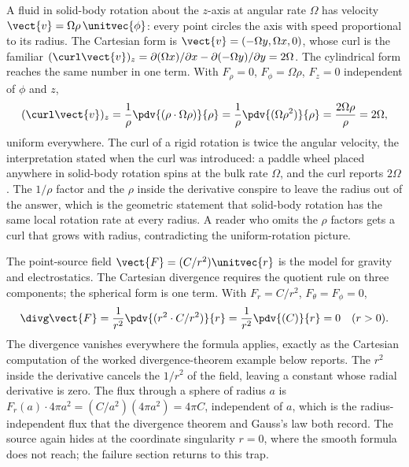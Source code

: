 \begin{example}
A fluid in solid-body rotation about the $z$-axis at angular rate
$\Omega$ has velocity $\vect{v} = \Omega\rho\,\unitvec{\phi}$: every
point circles the axis with speed proportional to its radius. The
Cartesian form is $\vect{v} = (-\Omega y, \Omega x, 0)$, whose curl is
the familiar $(\curl\vect{v})_{z} = \partial(\Omega x)/\partial x -
\partial(-\Omega y)/\partial y = 2\Omega$. The cylindrical form
reaches the same number in one term. With $F_{\rho} = 0$,
$F_{\phi} = \Omega\rho$, $F_{z} = 0$ independent of $\phi$ and $z$,
\[
(\curl\vect{v})_{z} = \frac{1}{\rho}\pdv{(\rho\cdot\Omega\rho)}{\rho}
= \frac{1}{\rho}\pdv{(\Omega\rho^{2})}{\rho} = \frac{2\Omega\rho}{\rho}
= 2\Omega,
\]
uniform everywhere. The curl of a rigid rotation is twice the angular
velocity, the interpretation stated when the curl was introduced: a
paddle wheel placed anywhere in solid-body rotation spins at the bulk
rate $\Omega$, and the curl reports $2\Omega$. The $1/\rho$ factor and
the $\rho$ inside the derivative conspire to leave the radius out of
the answer, which is the geometric statement that solid-body rotation
has the same local rotation rate at every radius. A reader who omits
the $\rho$ factors gets a curl that grows with radius, contradicting
the uniform-rotation picture.
\end{example}

\begin{example}
The point-source field $\vect{F} = (C/r^{2})\unitvec{r}$ is the model
for gravity and electrostatics. The Cartesian divergence requires the
quotient rule on three components; the spherical form is one term.
With $F_{r} = C/r^{2}$, $F_{\theta} = F_{\phi} = 0$,
\[
\divg\vect{F} = \frac{1}{r^{2}}\pdv{(r^{2}\cdot C/r^{2})}{r} =
\frac{1}{r^{2}}\pdv{(C)}{r} = 0 \quad(r > 0).
\]
The divergence vanishes everywhere the formula applies, exactly as the
Cartesian computation of the worked divergence-theorem example below
reports. The $r^{2}$ inside the derivative cancels the $1/r^{2}$ of
the field, leaving a constant whose radial derivative is zero. The
flux through a sphere of radius $a$ is $F_{r}(a)\cdot 4\pi a^{2} =
(C/a^{2})(4\pi a^{2}) = 4\pi C$, independent of $a$, which is the
radius-independent flux that the divergence theorem and Gauss's law
both record. The source again hides at the coordinate singularity
$r = 0$, where the smooth formula does not reach; the failure section
returns to this trap.
\end{example}

